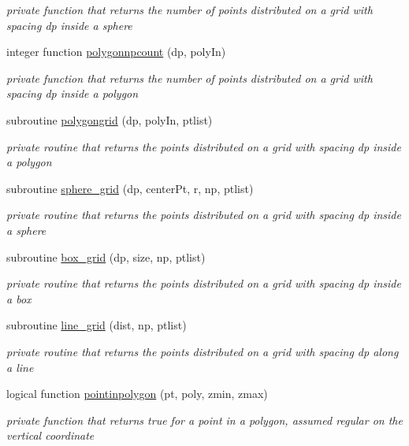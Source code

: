 \begin{DoxyCompactItemize}
\begin{DoxyCompactList}\small\item\em private function that returns the number of points distributed on a grid with spacing dp inside a sphere \end{DoxyCompactList}\item 
integer function \mbox{\hyperlink{namespacegeometry__mod_aaffceaeb22689f0aaee4568c662f192a}{polygonnpcount}} (dp, poly\+In)
\begin{DoxyCompactList}\small\item\em private function that returns the number of points distributed on a grid with spacing dp inside a polygon \end{DoxyCompactList}\item 
subroutine \mbox{\hyperlink{namespacegeometry__mod_a4862bb9e5bbc62fd581a34c4249b84d1}{polygongrid}} (dp, poly\+In, ptlist)
\begin{DoxyCompactList}\small\item\em private routine that returns the points distributed on a grid with spacing dp inside a polygon \end{DoxyCompactList}\item 
subroutine \mbox{\hyperlink{namespacegeometry__mod_a9b4ea4b26bc4f50dbfa3ba8b1d3fb2f2}{sphere\+\_\+grid}} (dp, center\+Pt, r, np, ptlist)
\begin{DoxyCompactList}\small\item\em private routine that returns the points distributed on a grid with spacing dp inside a sphere \end{DoxyCompactList}\item 
subroutine \mbox{\hyperlink{namespacegeometry__mod_ae87e4ecff2d21a839da2b82919b5fd0b}{box\+\_\+grid}} (dp, size, np, ptlist)
\begin{DoxyCompactList}\small\item\em private routine that returns the points distributed on a grid with spacing dp inside a box \end{DoxyCompactList}\item 
subroutine \mbox{\hyperlink{namespacegeometry__mod_a48e38bde8ea77f5e1bb42d3fa2c85037}{line\+\_\+grid}} (dist, np, ptlist)
\begin{DoxyCompactList}\small\item\em private routine that returns the points distributed on a grid with spacing dp along a line \end{DoxyCompactList}\item 
logical function \mbox{\hyperlink{namespacegeometry__mod_a51bc27aa95191008da7496c7b67b1bf4}{pointinpolygon}} (pt, poly, zmin, zmax)
\begin{DoxyCompactList}\small\item\em private function that returns true for a point in a polygon, assumed regular on the vertical coordinate \end{DoxyCompactList}\end{DoxyCompactItemize}
